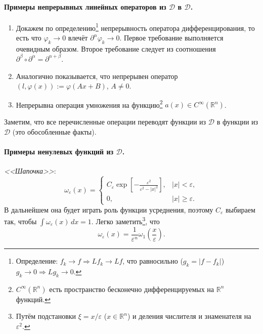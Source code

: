 \paragraph{Примеры непрерывных линейных операторов из $ \mathcal D $ в $ \mathcal D $.} 
\begin{enumerate}
  \item Докажем по определению\footnote{Определение: $ f_k \to f
      \Rightarrow Lf_k \to Lf $, что равносильно ($ g_k = |f - f_k| $) $ g_k \to 0
    \Rightarrow Lg_k \to 0 $.} непрерывность оператора дифференцирования, то есть
    что $ \varphi_k \to 0 $ влечёт $
    \partial^\alpha\varphi_k \to 0 $. Первое требование выполняется очевидным
    образом. Второе требование следует из соотношения $ \partial^\beta \circ
    \partial^\alpha = \partial^{\alpha + \beta} $.
  \item Аналогично показывается, что непрерывен оператор $ (l, \varphi(x)) :=
    \varphi(Ax + B) $, $ A \neq 0 $.
  \item  Непрерывна операция умножения на функцию\footnote{$C^\infty(\mathbb
      R^n)$ есть
    пространство бесконечно дифференцируемых на $ \mathbb R^n $ функций.} $
  a(x)\in C^\infty(\mathbb R^n) $.
\end{enumerate}
Заметим, что все перечисленные операции переводят функции из $ \mathcal D $ в
функции из $ \mathcal D $ (это обособленные факты).

\paragraph{Примеры ненулевых функций из $ \mathcal D $.}
\emph{<<Шапочка>>}: 
\[
  \omega_\varepsilon(x) = \begin{cases}
    C_\varepsilon\exp \left[ - \frac{\varepsilon^2}{\varepsilon^2 - |x|^2}
    \right], & |x| < \varepsilon,\\
    0, & |x| \geqslant \varepsilon.
  \end{cases}
\]
В дальнейшем она будет играть роль функции усреднения, поэтому $ C_\varepsilon $
выбираем так, чтобы $ \int \omega_\varepsilon(x)\,dx=1 $. Легко
заметить\footnote{Путём подстановки $ \xi = x/\varepsilon $ ($ x \in \mathbb R^n
  $) и деления числителя
и знаменателя на $ \varepsilon^2 $.}, что 
\[
    \omega_\varepsilon(x) = \frac{1}{\varepsilon^n}\omega_1 \left(
    \frac{x}{\varepsilon} \right).
\]

